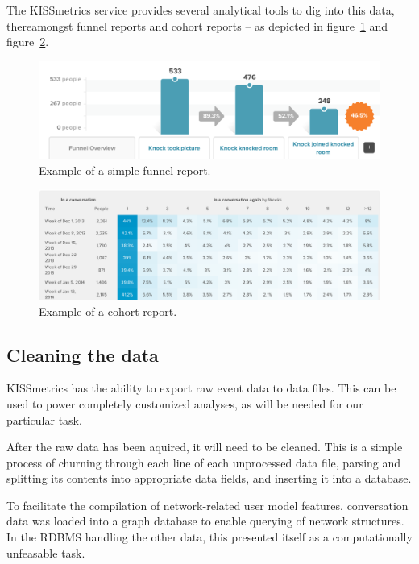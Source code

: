 The KISSmetrics service provides several analytical tools to dig into this data, thereamongst funnel reports and cohort reports -- as depicted in figure~\ref{fig:funnel-report} and figure~\ref{fig:cohort-report}.

\begin{figure}[h]
  \centering
    \includegraphics[width=\textwidth]{Figures/screenshots/km/funnel-example}
    \caption{Example of a simple funnel report.}
    \label{fig:funnel-report}
\end{figure}

\begin{figure}[h]
  \centering
    \includegraphics[width=\textwidth]{Figures/screenshots/km/cohort-example}
    \caption{Example of a cohort report.}
    \label{fig:cohort-report}
\end{figure}

\subsection{Cleaning the data}
\label{approach:sec:cleaning_data}

KISSmetrics has the ability to export raw event data to data files. This can be used to power completely customized analyses, as will be needed for our particular task.

After the raw data has been aquired, it will need to be cleaned. This is a simple process of churning through each line of each unprocessed data file, parsing and splitting its contents into appropriate data fields, and inserting it into a database.

To facilitate the compilation of network-related user model features, conversation data was loaded into a graph database to enable querying of network structures. In the RDBMS handling the other data, this presented itself as a computationally unfeasable task.

